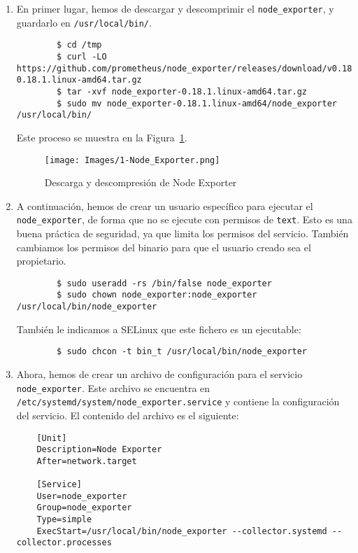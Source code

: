 \documentclass[a4paper,12pt]{article}
\begin{document}
\begin{enumerate}
    \item En primer lugar, hemos de descargar y descomprimir el \verb|node_exporter|, y guardarlo en \verb|/usr/local/bin/|.
    \begin{verbatim}
        $ cd /tmp
        $ curl -LO https://github.com/prometheus/node_exporter/releases/download/v0.18.1/node_exporter-0.18.1.linux-amd64.tar.gz
        $ tar -xvf node_exporter-0.18.1.linux-amd64.tar.gz
        $ sudo mv node_exporter-0.18.1.linux-amd64/node_exporter /usr/local/bin/
    \end{verbatim}

    Este proceso se muestra en la Figura~\ref{fig:1-Node_Exporter}.
    \begin{figure}[h]
        \centering
        \texttt{[image: Images/1-Node\_Exporter.png]}
        \caption{Descarga y descompresión de Node Exporter}
        \label{fig:1-Node_Exporter}
    \end{figure}


    \item A continuación, hemos de crear un usuario específico para ejecutar el \verb|node_exporter|, de forma que no se ejecute con permisos de \verb|text|. Esto es una buena práctica de seguridad, ya que limita los permisos del servicio. También cambiamos los permisos del binario para que el usuario creado sea el propietario.
    \begin{verbatim}
        $ sudo useradd -rs /bin/false node_exporter
        $ sudo chown node_exporter:node_exporter /usr/local/bin/node_exporter
    \end{verbatim}


    También le indicamos a SELinux que este fichero es un ejecutable:
    \begin{verbatim}
        $ sudo chcon -t bin_t /usr/local/bin/node_exporter
    \end{verbatim}

    \item Ahora, hemos de crear un archivo de configuración para el servicio \verb|node_exporter|. Este archivo se encuentra en \verb|/etc/systemd/system/node_exporter.service| y contiene la configuración del servicio. El contenido del archivo es el siguiente:
    \begin{verbatim}
    [Unit]
    Description=Node Exporter
    After=network.target

    [Service]
    User=node_exporter
    Group=node_exporter
    Type=simple
    ExecStart=/usr/local/bin/node_exporter --collector.systemd --collector.processes


\end{verbatim}
\end{enumerate}
\end{document}

